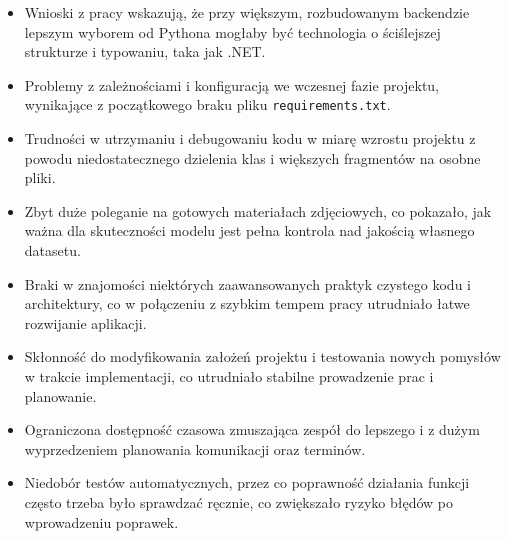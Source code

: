 \documentclass[12pt,a4paper]{article}
\begin{document}
\begin{itemize}
    \item Wnioski z pracy wskazują, że przy większym, rozbudowanym backendzie lepszym wyborem od Pythona mogłaby być technologia o ściślejszej strukturze i typowaniu, taka jak .NET.
    \item Problemy z zależnościami i konfiguracją we wczesnej fazie projektu, wynikające z początkowego braku pliku \texttt{requirements.txt}.
    \item Trudności w utrzymaniu i debugowaniu kodu w miarę wzrostu projektu z powodu niedostatecznego dzielenia klas i większych fragmentów na osobne pliki.
    \item Zbyt duże poleganie na gotowych materiałach zdjęciowych, co pokazało, jak ważna dla skuteczności modelu jest pełna kontrola nad jakością własnego datasetu.
    \item Braki w znajomości niektórych zaawansowanych praktyk czystego kodu i architektury, co w połączeniu z szybkim tempem pracy utrudniało łatwe rozwijanie aplikacji.
    \item Skłonność do modyfikowania założeń projektu i testowania nowych pomysłów w trakcie implementacji, co utrudniało stabilne prowadzenie prac i planowanie.
    \item Ograniczona dostępność czasowa zmuszająca zespół do lepszego i z dużym wyprzedzeniem planowania komunikacji oraz terminów.
    \item Niedobór testów automatycznych, przez co poprawność działania funkcji często trzeba było sprawdzać ręcznie, co zwiększało ryzyko błędów po wprowadzeniu poprawek.
\end{itemize}
\end{document}
